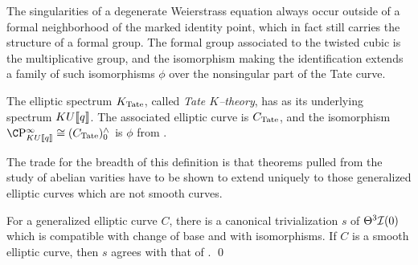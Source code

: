 \begin{remark}\label{TwistedCubicGivesGm}
The singularities of a degenerate Weierstrass equation always occur outside of a formal neighborhood of the marked identity point, which in fact still carries the structure of a formal group.  The formal group associated to the twisted cubic is the multiplicative group, and the isomorphism making the identification extends a family of such isomorphisms $\phi$ over the nonsingular part of the Tate curve.
\end{remark}

\begin{definition}
The elliptic spectrum $K_{\mathrm{Tate}}$, called \textit{Tate $K$--theory}, has as its underlying spectrum $KU\llbracket{q}\rrbracket$.  The associated elliptic curve is $C_{\mathrm{Tate}}$, and the isomorphism $\CP^\infty_{KU\ps{q}} \cong (C_{\Tate})^\wedge_0$ is $\phi$ from .
\end{definition}

\noindent The trade for the breadth of this definition is that theorems pulled from the study of abelian varities have to be shown to extend uniquely to those generalized elliptic curves which are not smooth curves.

\begin{theorem}\label{GeneralizedTheta3IsTrivial}
For a generalized elliptic curve $C$, there is a canonical trivialization $s$ of $\Theta^3 \mathcal{I}(0)$ which is compatible with change of base and with isomorphisms.  If $C$ is a smooth elliptic curve, then $s$ agrees with that of . \qed
\end{theorem}

